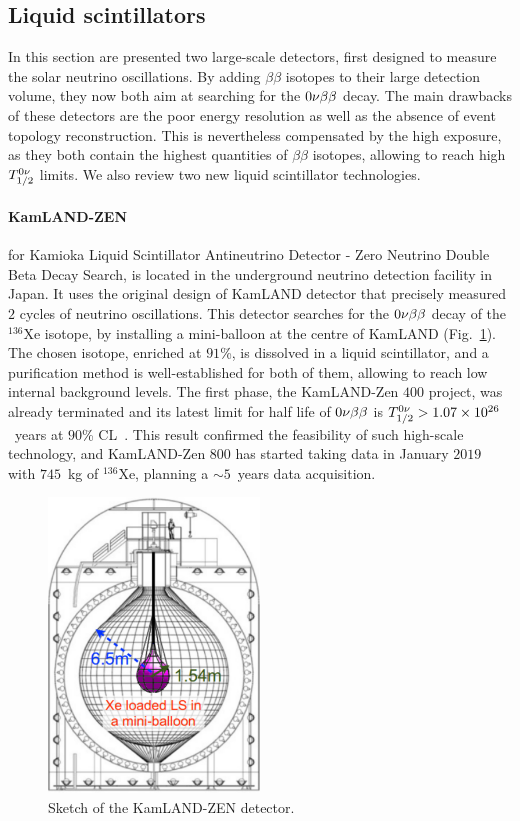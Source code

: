 \subsection{Liquid scintillators}
\label{subsec:scintillators}

In this section are presented two large-scale detectors, first designed to measure the solar neutrino oscillations.
By adding $\beta\beta$ isotopes to their large detection volume, they now both aim at searching for the $0\nu\beta\beta$ decay.
The main drawbacks of these detectors are the poor energy resolution as well as the absence of event topology reconstruction.
This is nevertheless compensated by the high exposure, as they both contain the highest quantities of $\beta\beta$ isotopes, allowing to reach high $T_{1/2}^{0\nu}$ limits.
We also review two new liquid scintillator technologies.

\paragraph{KamLAND-ZEN} for Kamioka Liquid Scintillator Antineutrino Detector - Zero Neutrino Double Beta Decay Search, is located in the underground neutrino detection facility in Japan.
It uses the original design of KamLAND detector that precisely measured $2$ cycles of neutrino oscillations.
This detector searches for the $0\nu\beta\beta$ decay of the $^{136}$Xe isotope, by installing a mini-balloon at the centre of KamLAND (Fig.~\ref{fig:KamLAND}).
The chosen isotope, enriched at $91$\%, is dissolved in a liquid scintillator, and a purification method is well-established for both of them, allowing to reach low internal background levels.
The first phase, the KamLAND-Zen $400$ project, was already terminated and its latest limit for half life of $0\nu\beta\beta$ is $T_{1/2}^{0\nu}>1.07\times 10^{26}$~years at $90$\% CL~\cite{art:KamLAND2016}.
This result confirmed the feasibility of such high-scale technology, and KamLAND-Zen $800$ has started taking data in January $2019$ with $745$~kg of $^{136}$Xe, planning a $\sim 5$~years data acquisition.

\begin{figure}
  \centering
  \includegraphics[width=0.5\textwidth]{neutrinophysics/fig_neutrinophysics/KamLAND-ZEN.pdf}
  \caption{Sketch of the KamLAND-ZEN detector.
    \label{fig:KamLAND}}
\end{figure}

